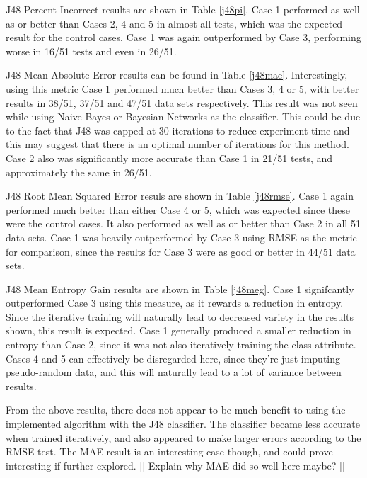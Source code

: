 J48 Percent Incorrect results are shown in Table \ref{j48pi}. Case 1 performed as well as or better than Cases 2, 4 and 5 in almost all tests, which was the expected result for the control cases. Case 1 was again outperformed by Case 3, performing worse in 16/51 tests and even in 26/51. 

J48 Mean Absolute Error results can be found in Table \ref{j48mae}. Interestingly, using this metric Case 1 performed much better than Cases 3, 4 or 5, with better results in 38/51, 37/51 and 47/51 data sets respectively. This result was not seen while using Naive Bayes or Bayesian Networks as the classifier. This could be due to the fact that J48 was capped at 30 iterations to reduce experiment time and this may suggest that there is an optimal number of iterations for this method. Case 2 also was significantly more accurate than Case 1 in 21/51 tests, and approximately the same in 26/51.  

J48 Root Mean Squared Error resuls are shown in Table \ref{j48rmse}. Case 1 again performed much better than either Case 4 or 5, which was expected since these were the control cases. It also performed as well as or better than Case 2 in all 51 data sets. Case 1 was heavily outperformed by Case 3 using RMSE as the metric for comparison, since the results for Case 3 were as good or better in 44/51 data sets.

J48 Mean Entropy Gain results are shown in Table \ref{j48meg}. Case 1 signifcantly outperformed Case 3 using this measure, as it rewards a reduction in entropy. Since the iterative training will naturally lead to decreased variety in the results shown, this result is expected. Case 1 generally produced a smaller reduction in entropy than Case 2, since it was not also iteratively training the class attribute. Cases 4 and 5 can effectively be disregarded here, since they're just imputing pseudo-random data, and this will naturally lead to a lot of variance between results.

From the above results, there does not appear to be much benefit to using the implemented algorithm with the J48 classifier. The classifier became less accurate when trained iteratively, and also appeared to make larger errors according to the RMSE test. The MAE result is an interesting case though, and could prove interesting if further explored. [[ Explain why MAE did so well here maybe? ]]





\FloatBarrier
